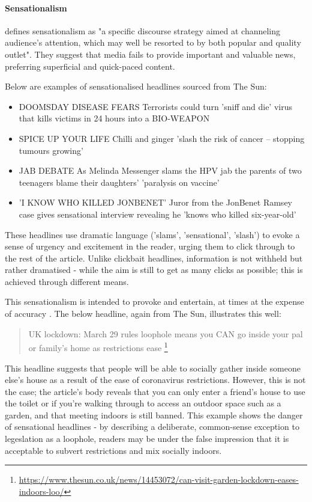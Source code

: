 \paragraph{Sensationalism}
 defines sensationalism as "a specific discourse strategy aimed at channeling audience's attention,  which may well be  resorted to by both popular and quality outlet". They suggest that media fails to provide important and valuable news, preferring superficial and quick-paced content.

Below are examples of sensationalised headlines sourced from The Sun:

\begin{itemize}
	\item DOOMSDAY DISEASE FEARS Terrorists could turn 'sniff and die' virus that kills victims in 24 hours into a BIO-WEAPON
	\item SPICE UP YOUR LIFE Chilli and ginger 'slash the risk of cancer – stopping tumours growing'
	\item JAB DEBATE As Melinda Messenger slams the HPV jab the parents of two teenagers blame their daughters' 'paralysis on vaccine'
	\item 'I KNOW WHO KILLED JONBENET' Juror from the JonBenet Ramsey case gives sensational interview revealing he 'knows who killed six-year-old'
	
\end{itemize}

These headlines use dramatic language ('slams', 'sensational', 'slash') to evoke a sense of urgency and excitement in the reader, urging them to click through to the rest of the article. Unlike clickbait headlines, information is not withheld but rather dramatised - while the aim is still to get as many clicks as possible; this is achieved through different means.

This sensationalism is intended to provoke and entertain, at times at the expense of accuracy \cite{chesney2017}. The below headline, again from The Sun, illustrates this well:

\begin{quote}
UK lockdown: March 29 rules loophole means you CAN go inside your pal or family’s home as restrictions ease \footnote{\url{https://www.thesun.co.uk/news/14453072/can-visit-garden-lockdown-eases-indoors-loo/}}
\end{quote}

This headline suggests that people will be able to socially gather inside someone else's house as a result of the ease of coronavirus restrictions. However, this is not the case; the article's body reveals that you can only enter a friend's house to use the toilet or if you're walking through to access an outdoor space such as a garden, and that meeting indoors is still banned.
 This example shows the danger of sensational headlines - by describing a deliberate, common-sense exception to legeslation as a loophole, readers may be under the false impression that it is acceptable to subvert restrictions and mix socially indoors.



